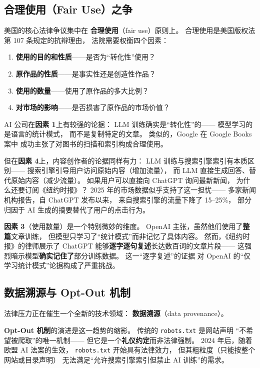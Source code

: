 \subsection{合理使用（Fair Use）之争}

美国的核心法律争议集中在
\textbf{合理使用}（fair use）原则上。
合理使用是美国版权法第 107 条规定的抗辩理由，
法院需要权衡四个因素：
\begin{enumerate}[noitemsep]
  \item \textbf{使用的目的和性质}——是否为``转化性''使用？
  \item \textbf{原作品的性质}——是事实性还是创造性作品？
  \item \textbf{使用的数量}——使用了原作品的多大比例？
  \item \textbf{对市场的影响}——是否损害了原作品的市场价值？
\end{enumerate}

AI 公司在\textbf{因素 1}上有较强的论据：
LLM 训练确实是``转化性''的——
模型学习的是语言的统计模式，
而不是复制特定的文章。
类似的，Google 在 Google Books 案中
成功主张了对图书的扫描和索引构成合理使用。

但在\textbf{因素 4}上，内容创作者的论据同样有力：
LLM 训练与搜索引擎索引有本质区别——
搜索引擎引导用户访问原始内容（增加流量），
而 LLM 直接生成回答、替代原始内容（减少流量）。
如果用户可以直接向 ChatGPT 询问最新新闻，
为什么还要订阅《纽约时报》？
2025 年的市场数据似乎支持了这一担忧——
多家新闻机构报告，自 ChatGPT 发布以来，
来自搜索引擎的流量下降了 15--25\%，
部分归因于 AI 生成的摘要替代了用户的点击行为。

\textbf{因素 3}（使用数量）是一个特别微妙的维度。
OpenAI 主张，虽然他们使用了\textbf{整篇}文章训练，
但模型只学习了``统计模式''而非记忆了具体内容。
然而，《纽约时报》的律师展示了
ChatGPT 能够\textbf{逐字逐句复述}长达数百词的文章片段——
这强烈暗示模型\textbf{确实记住了}部分训练数据。
这一``逐字复述''的证据
对 OpenAI 的``仅学习统计模式''论据构成了严重挑战。

\subsection{数据溯源与 Opt-Out 机制}

法律压力正在催生一个全新的技术领域：
\textbf{数据溯源}（data provenance）。

\textbf{Opt-Out 机制}的演进是这一趋势的缩影。
传统的 \texttt{robots.txt} 是网站声明
``不希望被爬取''的唯一机制——
但它是一个\textbf{礼仪约定}而非法律强制。
2024 年后，随着欧盟 AI 法案的生效，
\texttt{robots.txt} 开始具有法律效力，
但其粗粒度（只能按整个网站或目录声明）
无法满足``允许搜索引擎索引但禁止 AI 训练''的需求。

